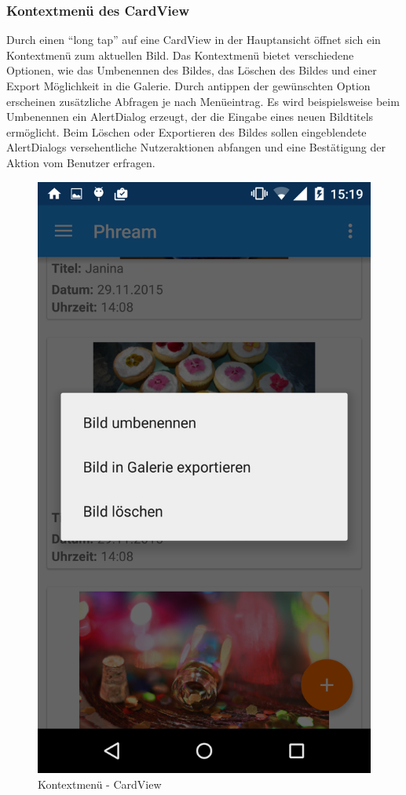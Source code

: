 \subsubsection{Kontextmenü des CardView}

Durch einen \enquote{long tap} auf eine CardView in der Hauptansicht öffnet sich ein Kontextmenü zum aktuellen Bild. Das Kontextmenü bietet verschiedene Optionen, wie das Umbenennen des Bildes, das Löschen des Bildes und einer Export Möglichkeit in die Galerie. Durch antippen der gewünschten Option erscheinen zusätzliche Abfragen je nach Menüeintrag. Es wird beispielsweise beim Umbenennen ein AlertDialog erzeugt, der die Eingabe eines neuen Bildtitels ermöglicht. Beim Löschen oder Exportieren des Bildes sollen eingeblendete AlertDialogs versehentliche Nutzeraktionen abfangen und eine Bestätigung der Aktion vom Benutzer erfragen.

\begin{figure}[H]
	\centering
   \includegraphics[scale= 0.115]{images/screenshots/contextmenu.png}
  \caption{Kontextmenü - CardView}
\end{figure}


